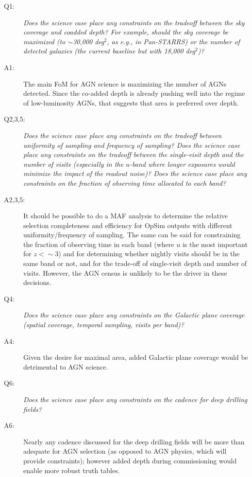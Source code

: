 \begin{description}

\item[Q1:] {\it Does the science case place any constraints on the
tradeoff between the sky coverage and coadded depth? For example, should
the sky coverage be maximized (to $\sim$30,000 deg$^2$, as e.g., in
Pan-STARRS) or the number of detected galaxies (the current baseline but
with 18,000 deg$^2$)?}

\item[A1:] The main FoM for AGN science is maximizing the number of AGNs
detected.  Since the co-added depth is already pushing well into the
regime of low-luminosity AGNs, that suggests that area is preferred over
depth.

\item[Q2,3,5:] {\it Does the science case place any constraints on the
tradeoff between uniformity of sampling and frequency of  sampling? Does
the science case place any constraints on the tradeoff between the
single-visit depth and the number of visits (especially in the $u$-band
where longer exposures would minimize the impact of the readout noise)?
Does the science case place any constraints on the fraction of observing
time allocated to each band?}

\item[A2,3,5:] It should be possible to do a MAF analysis to determine
the relative selection completeness and efficiency for OpSim outputs
with different uniformity/frequency of sampling. The same can be said
for constraining the fraction of observing time in each band (where $u$
is the most important for $z<\sim3$) and for determining whether nightly
visits should be in the same band or not, and for the trade-off of
single-visit depth and number of visits. However, the AGN census is
unlikely to be the driver in these decisions.

\item[Q4:] {\it Does the science case place any constraints on the
Galactic plane coverage (spatial coverage, temporal sampling, visits per
band)?}

\item[A4:] Given the desire for maximal area, added Galactic plane
coverage would be detrimental to AGN science.

\item[Q6:] {\it Does the science case place any constraints on the
cadence for deep drilling fields?}

\item[A6:] Nearly any cadence discussed for the deep drilling fields
will be more than adequate for AGN selection (as opposed to AGN
physics, which will provide constraints); however added depth during
commissioning would enable more robust truth tables.


\end{description}
